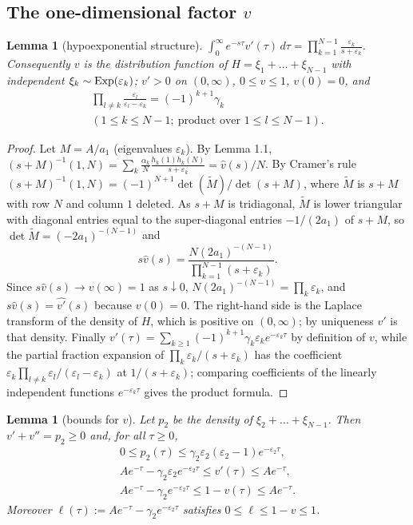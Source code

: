 \documentclass[11pt,a4paper]{article}
\newtheorem{lemma}[theorem]{Lemma}
\theoremstyle{definition}
\theoremstyle{remark}
\begin{document}
\subsection{The one-dimensional factor $v$}

\begin{lemma}[{hypoexponential structure}]
$\displaystyle\int_0^\infty e^{-s\tau}v'(\tau)\,d\tau=\prod_{k=1}^{N-1}\frac{\varepsilon_k}{s+\varepsilon_k}$. Consequently $v$ is the distribution function of $H=\xi_1+\dots+\xi_{N-1}$ with independent $\xi_k\sim{\rm Exp}(\varepsilon_k)$; $v'>0$ on $(0,\infty)$, $0\le v\le1$, $v(0)=0$, and
\begin{gather*}
\prod_{l\ne k}\frac{\varepsilon_l}{\varepsilon_l-\varepsilon_k}=(-1)^{k+1}\gamma_k \\
(1\le k\le N-1;\ \text{product over }1\le l\le N-1).
\end{gather*}
\end{lemma}

\begin{proof}
Let $M=A/a_1$ (eigenvalues $\varepsilon_k$). By Lemma 1.1, $(s+M)^{-1}(1,N)=\sum_k\frac{\alpha_k}{N}\frac{h_k(1)h_k(N)}{s+\varepsilon_k}=\hat v(s)/N$. By Cramer's rule $(s+M)^{-1}(1,N)=(-1)^{N+1}\det(\widetilde M)/\det(s+M)$, where $\widetilde M$ is $s+M$ with row $N$ and column $1$ deleted. As $s+M$ is tridiagonal, $\widetilde M$ is lower triangular with diagonal entries equal to the super-diagonal entries $-1/(2a_1)$ of $s+M$, so $\det\widetilde M=(-2a_1)^{-(N-1)}$ and
\begin{equation*}
s\hat v(s)=\frac{N(2a_1)^{-(N-1)}}{\prod_{k=1}^{N-1}(s+\varepsilon_k)} .
\end{equation*}
Since $s\hat v(s)\to v(\infty)=1$ as $s\downarrow0$, $N(2a_1)^{-(N-1)}=\prod_k\varepsilon_k$, and $s\hat v(s)=\hat{v'}(s)$ because $v(0)=0$. The right-hand side is the Laplace transform of the density of $H$, which is positive on $(0,\infty)$; by uniqueness $v'$ is that density. Finally $v'(\tau)=\sum_{k\ge1}(-1)^{k+1}\gamma_k\varepsilon_ke^{-\varepsilon_k\tau}$ by definition of $v$, while the partial fraction expansion of $\prod_k\varepsilon_k/(s+\varepsilon_k)$ has the coefficient $\varepsilon_k\prod_{l\ne k}\varepsilon_l/(\varepsilon_l-\varepsilon_k)$ at $1/(s+\varepsilon_k)$; comparing coefficients of the linearly independent functions $e^{-\varepsilon_k\tau}$ gives the product formula.
\end{proof}

\begin{lemma}[{bounds for $v$}]
Let $p_2$ be the density of $\xi_2+\dots+\xi_{N-1}$. Then $v'+v''=p_2\ge0$ and, for all $\tau\ge0$,
\begin{gather*}
0\le p_2(\tau)\le\gamma_2\varepsilon_2(\varepsilon_2-1)e^{-\varepsilon_2\tau}, \\
Ae^{-\tau}-\gamma_2\varepsilon_2e^{-\varepsilon_2\tau}\le v'(\tau)\le Ae^{-\tau}, \\
Ae^{-\tau}-\gamma_2e^{-\varepsilon_2\tau}\le1-v(\tau)\le Ae^{-\tau}.
\end{gather*}
Moreover $\ell(\tau):=Ae^{-\tau}-\gamma_2e^{-\varepsilon_2\tau}$ satisfies $0\le\ell\le1-v\le1$.
\end{lemma}
\end{document}
